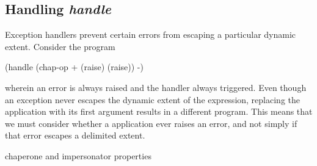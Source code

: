 \subsection{Handling \emph{handle}}

Exception handlers prevent certain errors from escaping a particular dynamic extent.
Consider the program
\begin{schemedisplay}
(handle
  (chap-op + (raise) (raise))
  -)
\end{schemedisplay}
wherein an error is always raised and the handler always triggered.
Even though an exception never escapes the dynamic extent of the  expression, replacing the  application with its first argument results in a different program. 
This means that we must consider whether a  application ever raises an error, and not simply if that error escapes a delimited extent.

chaperone and impersonator properties